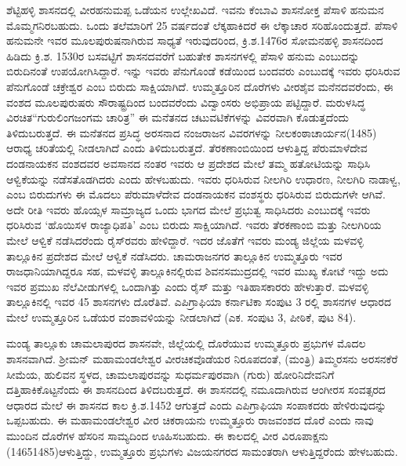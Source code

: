 ಶೆಟ್ಟಿಹಳ್ಳಿ ಶಾಸನದಲ್ಲಿ ವೀರಹನುಮಪ್ಪ ಒಡೆಯನ ಉಲ್ಲೇಖವಿದೆ. ಇವನು ಕೆಂಬಾವಿ ಶಾಸನೋಕ್ತ ಪೆಸಾಳಿ ಹನುಮನ ಮೊಮ್ಮಗನಿರಬಹುದು. ಒಂದು ತಲೆಮಾರಿಗೆ 25 ವರ್ಷದಂತೆ ಲೆಕ್ಕಹಾಕಿದರೆ ಈ ಲೆಕ್ಕಾಚಾರ ಸರಿಹೊಂದುತ್ತದೆ. ಪೆಸಾಳಿ ಹನುಮನೇ ಇವರ ಮೂಲಪುರುಷನಾಗಿರುವ ಸಾಧ್ಯತೆ ಇರುವುದರಿಂದ, ಕ್ರಿ.ಶ.1476ರ ಸೋಮನಹಳ್ಳಿ ಶಾಸನದಿಂದ ಹಿಡಿದು ಕ್ರಿ.ಶ. 1530ರ ಬಸವಟ್ಟಿಗೆ ಶಾಸನದವರೆಗೆ ಬಹುತೇಕ ಶಾಸನಗಳಲ್ಲಿ ಪೆಸಾಳಿ ಹನುಮ ಎಂಬುದನ್ನು ಬಿರುದಿನಂತೆ ಉಪಯೋಗಿಸಿದ್ದಾರೆ. ಇನ್ನು ಇವರು ಪೆನುಗೊಂಡೆ ಕಡೆಯಿಂದ ಬಂದವರು ಎಂಬುದಕ್ಕೆ ಇವರು ಧರಿಸಿರುವ ಪೆನುಗೊಂಡೆ ಚಕ್ರೇಶ್ವರ ಎಂಬ ಬಿರುದು ಸಾಕ್ಷಿಯಾಗಿದೆ. ಉಮ್ಮತ್ತೂರಿನ ದೊರೆಗಳು ವೀರಶೈವ ಮನೆನದವರೆಂದು, ಈ ವಂಶದ ಮೂಲಪುರುಷರು ಸೌರಾಷ್ಟ್ರದಿಂದ ಬಂದವರೆಂದು ವಿದ್ವಾಂಸರು ಅಭಿಪ್ರಾಯ ಪಟ್ಟಿದ್ದಾರೆ. ಮರುಳಸಿದ್ಧ ವಿರಚಿತ\break “ಗುರುಲಿಂಗಜಂಗಮ ಚಾರಿತ್ರ” ಈ ಮನೆತನದ ಚಟುವಟಿಕೆಗಳನ್ನು ವಿವರವಾಗಿ ಕೊಡುತ್ತದೆಂದು ತಿಳಿದುಬರುತ್ತದೆ. ಈ ಮನೆತನದ ಪ್ರಸಿದ್ಧ ಅರಸನಾದ ನಂಜರಾಜನ ವಿವರಗಳನ್ನು ನೀಲಕಂಠಾಚಾರ್ಯನ(1485) ಆರಾಧ್ಯ ಚರಿತೆಯಲ್ಲಿ ನೀಡಲಾಗಿದೆ ಎಂದು ತಿಳಿದುಬರುತ್ತದೆ. ತೆರಕಣಾಂಬಿಯಿಂದ ಆಳುತ್ತಿದ್ದ ಪೆರುಮಾಳೆದೇವ ದಂಡನಾಯಕನ ವಂಶದವರ ಅವಸಾನದ ನಂತರ ಇವರು ಆ ಪ್ರದೇಶದ ಮೇಲೆ ತಮ್ಮ ಹತೋಟಿಯನ್ನು ಸಾಧಿಸಿ ಆಳ್ವಿಕೆಯನ್ನು ನಡೆಸತೊಡಗಿದರು ಎಂದು ಹೇಳಬಹುದು. ಇವರು ಧರಿಸಿರುವ ನೀಲಗಿರಿ ಉಧಾರಣ, ನೀಲಗಿರಿ ನಾಡಾಳ್ವ, ಎಂಬ ಬಿರುದುಗಳು ಈ ಮೊದಲು ಪೆರುಮಾಳೆದೇವ ದಂಡನಾಯಕನ ವಂಶಸ್ಥರು ಧರಿಸಿರುವ ಬಿರುದುಗಳೇ ಆಗಿವೆ. ಅದೇ ರೀತಿ ಇವರು ಹೊಯ್ಸಳ ಸಾಮ್ರಾಜ್ಯದ ಒಂದು ಭಾಗದ ಮೇಲೆ ಪ್ರಭುತ್ವ ಸಾಧಿಸಿದರು ಎಂಬುದಕ್ಕೆ ಇವರು ಧರಿಸಿರುವ `ಹೊಯಿಸಳ ರಾಜ್ಯಾಧಿಪತಿ' ಎಂಬ ಬಿರುದು ಸಾಕ್ಷಿಯಾಗಿದೆ. ಇವರು ತೆರಕಣಾಂಬಿ ಮತ್ತು ನೀಲಗಿರಿಯ ಮೇಲೆ ಆಳ್ವಿಕೆ ನಡೆಸಿದರೆಂದು ರೈಸ್​ರವರು ಹೇಳಿದ್ದಾರೆ. ಇದರ ಜೊತೆಗೆ ಇವರು ಮಂಡ್ಯ ಜಿಲ್ಲೆಯ ಮಳವಳ್ಳಿ ತಾಲ್ಲೂಕಿನ ಪ್ರದೇಶದ ಮೇಲೆ ಆಳ್ವಿಕೆ ನಡೆಸಿದರು. ಚಾಮರಾಜನಗರ ತಾಲ್ಲೂಕಿನ ಉಮ್ಮತ್ತೂರು ಇವರ ರಾಜಧಾನಿಯಾಗಿದ್ದರೂ ಸಹ, ಮಳವಳ್ಳಿ ತಾಲ್ಲೂಕಿನಲ್ಲಿರುವ ಶಿವನಸಮುದ್ರದಲ್ಲಿ ಇವರ ಮುಖ್ಯ ಕೋಟೆ ಇದ್ದು ಅದು ಇವರ ಪ್ರಮುಖ ನೆಲೆವೀಡುಗಳಲ್ಲಿ ಒಂದಾಗಿತ್ತು ಎಂದು ರೈಸ್​ ಮತ್ತು ಇತಿಹಾಸಕಾರರು ಹೇಳುತ್ತಾರೆ. ಮಳವಳ್ಳಿ ತಾಲ್ಲೂಕಿನಲ್ಲಿ ಇವರ 45 ಶಾಸನಗಳು ದೊರೆತಿವೆ. ಎಪಿಗ್ರಾಫಿಯಾ ಕರ್ನಾಟಿಕಾ ಸಂಪುಟ 3 ರಲ್ಲಿ ಶಾಸನಗಳ ಆಧಾರದ ಮೇಲೆ ಉಮ್ಮತ್ತೂರಿನ ಒಡೆಯರ ವಂಶಾವಳಿಯನ್ನು ನೀಡಲಾಗಿದೆ (ಎಕ. ಸಂಪುಟ 3, ಪೀಠಿಕೆ, ಪುಟ 84).

ಮಂಡ್ಯ ತಾಲ್ಲೂಕು ಚಾಮಲಾಪುರದ ಶಾಸನವೇ, ಜಿಲ್ಲೆಯಲ್ಲಿ ದೊರೆಯುವ ಉಮ್ಮತ್ತೂರು ಪ್ರಭುಗಳ ಮೊದಲ ಶಾಸನವಾಗಿದೆ. ಶ‍್ರೀಮನ್​ ಮಹಾಮಂಡಲೇಶ್ವರ ವೀರಚಿಕವೊಡೆಯರ ನಿರೂಪದಂತೆ, (ಮಂತ್ರಿ) ತಿಮ್ಮರಸನು ಅರಸನಕೆರೆ ಸೀಮೆಯ, ಹುಲಿವನ ಸ್ಥಳದ, ಚಾಮಲಾಪುರವನ್ನು ಸುಧರ್ಮಪುರವಾಗಿ (ಗುರು) ಹೋರಿನಿದೇವನಿಗೆ ದತ್ತಿಹಾಕಿಕೊಟ್ಟನೆಂದು ಈ ಶಾಸನದಿಂದ ತಿಳಿದಬರುತ್ತದೆ. ಈ ಶಾಸನದಲ್ಲಿ ನಮೂದಾಗಿರುವ ಆಂಗೀರಸ ಸಂವತ್ಸರದ ಆಧಾರದ ಮೇಲೆ ಈ ಶಾಸನದ ಕಾಲ ಕ್ರಿ.ಶ.1452 ಆಗುತ್ತದೆ ಎಂದು ಎಪಿಗ್ರಾಫಿಯಾ ಸಂಪಾಕದರು ಹೇಳಿರುವುದನ್ನು ಒಪ್ಪಬಹುದು. ಈ ಮಹಾಮಂಡಲೇಶ್ವರ ವೀರ ಚಿಕರಾಯನು ಉಮ್ಮತ್ತೂರು ರಾಜವಂಶದ ದೊರೆ ಎಂದು ನಾವು ಮುಂದಿನ ದೊರೆಗಳ ಹೆಸರಿನ ಸಾಮ್ಯದಿಂದ ಊಹಿಸಬಹುದು. ಈ ಕಾಲದಲ್ಲಿ ವೀರ ವಿರೂಪಾಕ್ಷನು (14651485)ಆಳುತ್ತಿದ್ದು, ಉಮ್ಮತ್ತೂರು ಪ್ರಭುಗಳು ವಿಜಯನಗರದ ಸಾಮಂತರಾಗಿ ಆಳುತ್ತಿದ್ದರೆಂದು ಹೇಳಬಹುದು. 

